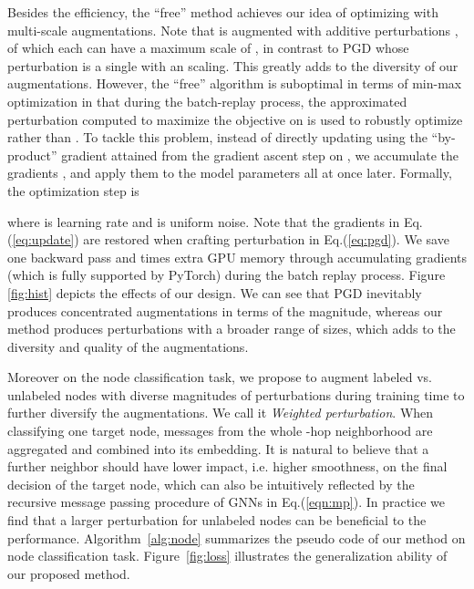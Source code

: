 \documentclass[11pt]{article}
\begin{document}
Besides the efficiency, the ``free'' method achieves our idea of optimizing  with multi-scale augmentations. Note that  is augmented with additive perturbations , of which each can have a maximum scale of , in contrast to PGD whose perturbation is a single  with an  scaling. This greatly adds to the diversity of our augmentations. However, the ``free'' algorithm is suboptimal in terms of min-max optimization in that during the batch-replay process, the approximated perturbation computed to maximize the objective on  is used to robustly optimize  rather than . To tackle this problem, instead of directly updating  using the ``by-product'' gradient attained from the gradient ascent step on , we accumulate the gradients , and apply them to the model parameters all at once later. Formally, the optimization step is 

where  is learning rate and  is uniform noise. Note that the gradients in Eq.(\ref{eq:update}) are restored when crafting perturbation in Eq.(\ref{eq:pgd}). We save one backward pass and  times extra GPU memory through accumulating gradients (which is fully supported by PyTorch) during the batch replay process. Figure \ref{fig:hist} depicts the effects of our design. We can see that PGD inevitably produces concentrated augmentations in terms of the magnitude, whereas our method produces perturbations with a broader range of sizes, which adds to the diversity and quality of the augmentations.

Moreover on the node classification task, we propose to augment labeled vs. unlabeled nodes with diverse magnitudes of perturbations during training time to further diversify the augmentations. We call it \textit{Weighted perturbation}. When classifying one target node, messages from the whole -hop neighborhood are aggregated and combined into its embedding. It is natural to believe that a further neighbor should have lower impact, i.e. higher smoothness, on the final decision of the target node, which can also be intuitively reflected by the recursive message passing procedure of GNNs in Eq.(\ref{eqn:mp}). In practice we find that a larger perturbation for unlabeled nodes can be beneficial to the performance.  Algorithm~\ref{alg:node} summarizes the pseudo code of our method on node classification task. Figure~\ref{fig:loss} illustrates the generalization ability of our proposed method.
\end{document}
